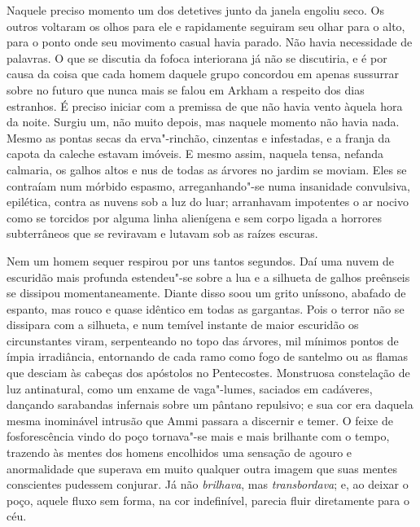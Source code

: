 Naquele preciso momento um dos detetives junto da janela engoliu seco.
Os outros voltaram os olhos para ele e rapidamente seguiram seu olhar
para o alto, para o ponto onde seu movimento casual havia parado. Não
havia necessidade de palavras. O que se discutia da fofoca interiorana
já não se discutiria, e é por causa da coisa que cada homem daquele
grupo concordou em apenas sussurrar sobre no futuro que nunca mais se
falou em Arkham a respeito dos dias estranhos. É preciso iniciar com a
premissa de que não havia vento àquela hora da noite. Surgiu um, não
muito depois, mas naquele momento não havia nada. Mesmo as pontas secas
da erva"-rinchão, cinzentas e infestadas, e a franja da capota da caleche
estavam imóveis. E mesmo assim, naquela tensa, nefanda calmaria, os
galhos altos e nus de todas as árvores no jardim se moviam. Eles se
contraíam num mórbido espasmo, arreganhando"-se numa insanidade
convulsiva, epilética, contra as nuvens sob a luz do luar; arranhavam
impotentes o ar nocivo como se torcidos por alguma linha alienígena e
sem corpo ligada a horrores subterrâneos que se reviravam e lutavam sob
as raízes escuras.

Nem um homem sequer respirou por uns tantos segundos. Daí uma nuvem de
escuridão mais profunda estendeu"-se sobre a lua e a silhueta de galhos
preênseis se dissipou momentaneamente. Diante disso soou um grito
uníssono, abafado de espanto, mas rouco e quase idêntico em todas as
gargantas. Pois o terror não se dissipara com a silhueta, e num temível
instante de maior escuridão os circunstantes viram, serpenteando no topo
das árvores, mil mínimos pontos de ímpia irradiância, entornando de cada
ramo como fogo de santelmo ou as flamas que desciam às cabeças dos
apóstolos no Pentecostes. Monstruosa constelação de luz antinatural,
como um enxame de vaga"-lumes, saciados em cadáveres, dançando sarabandas
infernais sobre um pântano repulsivo; e sua cor era daquela mesma
inominável intrusão que Ammi passara a discernir e temer. O feixe de
fosforescência vindo do poço tornava"-se mais e mais brilhante com o
tempo, trazendo às mentes dos homens encolhidos uma sensação de agouro e
anormalidade que superava em muito qualquer outra imagem que suas mentes
conscientes pudessem conjurar. Já não \textit{brilhava}, mas
\textit{transbordava}; e, ao deixar o poço, aquele fluxo sem forma, na cor
indefinível, parecia fluir diretamente para o céu.

